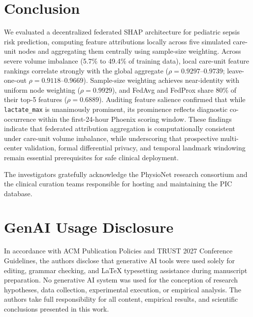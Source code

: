 \documentclass[sigconf,review,anonymous]{acmart}
\begin{document}
\section{Conclusion}\label{sec:concl}

We evaluated a decentralized federated SHAP architecture for pediatric sepsis risk prediction, computing feature attributions locally across five simulated care-unit nodes and aggregating them centrally using sample-size weighting. Across severe volume imbalance (5.7\% to 49.4\% of training data), local care-unit feature rankings correlate strongly with the global aggregate ($\rho = 0.9297$--$0.9739$; leave-one-out $\rho = 0.9118$--$0.9669$). Sample-size weighting achieves near-identity with uniform node weighting ($\rho = 0.9929$), and FedAvg and FedProx share 80\% of their top-5 features ($\rho = 0.6889$). Auditing feature salience confirmed that while \texttt{lactate\_max} is unanimously prominent, its prominence reflects diagnostic co-occurrence within the first-24-hour Phoenix scoring window. These findings indicate that federated attribution aggregation is computationally consistent under care-unit volume imbalance, while underscoring that prospective multi-center validation, formal differential privacy, and temporal landmark windowing remain essential prerequisites for safe clinical deployment.

\begin{acks}
The investigators gratefully acknowledge the PhysioNet research consortium and the clinical curation teams responsible for hosting and maintaining the PIC database.
\end{acks}

\section*{GenAI Usage Disclosure}
In accordance with ACM Publication Policies and TRUST 2027 Conference Guidelines, the authors disclose that generative AI tools were used solely for editing, grammar checking, and LaTeX typesetting assistance during manuscript preparation. No generative AI system was used for the conception of research hypotheses, data collection, experimental execution, or empirical analysis. The authors take full responsibility for all content, empirical results, and scientific conclusions presented in this work.



\end{document}
